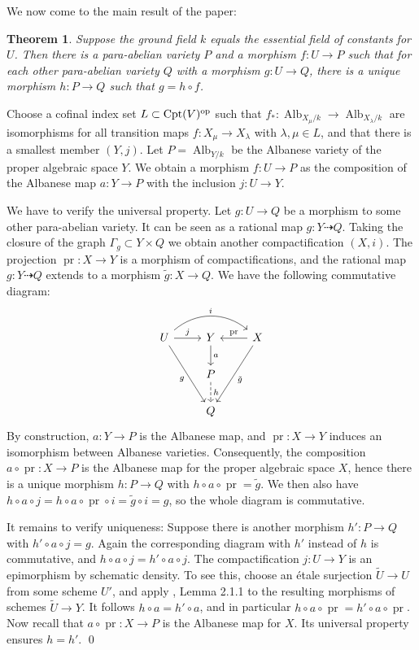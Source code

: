 \documentclass[oneside, 12pt]{amsart}
\newcommand\mylabel[1]{\label{#1}\marginpar{\vspace{-1ex}\medskip\medskip\footnotesize \tt #1}}
\renewcommand\mylabel[1]{\label{#1}}
\newtheorem{theorem}{Theorem}[section]
\theoremstyle{definition}
\theoremstyle{remark}
\newcommand{\Alb}{\operatorname{Alb}}
\newcommand{\op}{\text{\rm op}}
\newcommand{\pr}{\operatorname{pr}}
\newcommand{\ra}{\rightarrow}
\newcommand{\Cpt}{\operatorname{Cpt}}
\begin{document}
\medskip
We now come to the main result of the paper:

\begin{theorem}
\mylabel{existence albanese map}
Suppose the ground field $k$ equals the essential field of constants for $U$.
Then there is a para-abelian variety $P$ and a morphism $f:U\ra P$ such that for each other
para-abelian variety $Q$ with a morphism $g:U\ra Q$, there is a unique morphism $h:P\ra Q$ such
that $g=h\circ f$.
\end{theorem} 

\proof
Choose a cofinal index set $L\subset\Cpt(V)^\op$ such that $f_*:\Alb_{X_\mu/k}\ra \Alb_{X_\lambda/k}$
are isomorphisms for all transition maps $f:X_\mu\ra X_\lambda$ with $\lambda,\mu\in L$, and that there is a smallest member $(Y,j)$.
Let  $P=\Alb_{Y/k}$ be the Albanese variety of the proper algebraic space $Y$.
We obtain a morphism $f:U\ra P$ as the  composition of the Albanese map $a:Y\ra P$ with the inclusion $j:U\ra Y$.

We have  to verify the universal property. Let $g:U\ra Q$ be a morphism to some other para-abelian variety.
It can be seen as a rational map $g:Y\dashrightarrow Q$.
Taking the closure of the graph $\Gamma_g\subset Y\times Q$ we obtain another compactification $(X,i)$.
The projection $\pr:X\ra Y$ is a  morphism of compactifications, and  the rational map $g:Y\dashrightarrow Q$ extends to a morphism $\tilde{g}:X\ra Q$.
We have the following commutative diagram:
$$
\begin{tikzcd} 
U\ar[r,"j"]\ar[ddr,"g"']\ar[rr, bend left=40,"i"]	& Y\ar[d,"a"]		&X\ar[l,"\pr"']\ar[ddl,"\tilde{g}"]\\
					& P\ar[d,dashed,"h"]\\
					& Q
\end{tikzcd}
$$
By construction, $a:Y\ra P$ is the Albanese map, and $\pr:X\ra Y$ induces an isomorphism between    Albanese varieties.
Consequently, the composition $a\circ \pr:X\ra P$ is the Albanese map for the proper algebraic space $X$, hence there is a unique morphism $h:P\ra Q$ 
with $h\circ a\circ\pr=\tilde{g}$. We then also have 
$h\circ a\circ j = h\circ a\circ\pr\circ i = \tilde{g}\circ i = g$,
so the whole diagram is commutative.

It remains to verify   uniqueness:  Suppose there is another morphism $h':P\ra Q$ with $h'\circ a\circ j=g$. Again the  corresponding diagram 
with $h'$ instead of $h$ is commutative,
and $h\circ a\circ j = h' \circ a\circ j$.
The compactification $j:U\ra Y$ is an epimorphism by schematic density. To see this, choose an \'etale surjection $\tilde{U}\ra U$ from 
some scheme $U'$, and apply \cite{Romagny; Rydh; Zalamansky 2018}, Lemma 2.1.1 to the resulting morphisms of schemes $\tilde{U}\ra Y$.
It follows  $h\circ a = h'\circ a$,
and in particular $h\circ a \circ \pr= h'\circ a\circ \pr$. 
Now recall that $a\circ \pr:X\ra P$ is the Albanese map for $X$. Its  universal property
ensures $h=h'$.
\qed
\end{document}
